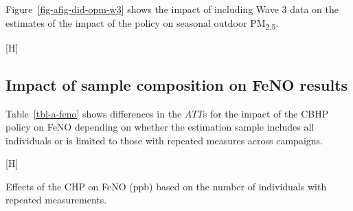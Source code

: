 \documentclass[
  letterpaper,
  DIV=11,
  numbers=noendperiod]{scrartcl}
\makeatletter
\renewenvironment{table}%
   {\renewcommand\familydefault\sfdefault
    \@float{table}}
   {\end@float}
\renewenvironment{figure}%
   {\renewcommand\familydefault\sfdefault
    \@float{figure}}
   {\end@float}
\makeatother
\begin{document}
Figure~\ref{fig-afig-did-opm-w3} shows the impact of including Wave 3
data on the estimates of the impact of the policy on seasonal outdoor
PM\textsubscript{2.5}.

\begin{figure}[H]

\caption{\label{fig-afig-did-opm-w3}Effects of the CHP on outdoor
seasonal PM\textsubscript{2.5} based on whether Season 3 data are
included vs.~excluded.}


\end{figure}%

\subsection{Impact of sample composition on FeNO
results}\label{impact-of-sample-composition-on-feno-results}

Table~\ref{tbl-a-feno} shows differences in the \(ATT\)s for the impact
of the CBHP policy on FeNO depending on whether the estimation sample
includes all individuals or is limited to those with repeated measures
across campaigns.

\begin{table}[H]

\caption{\label{tbl-a-feno}Effects of the CHP on FeNO (ppb) based on the
number of individuals with repeated measurements.}


\end{table}%
\end{document}
